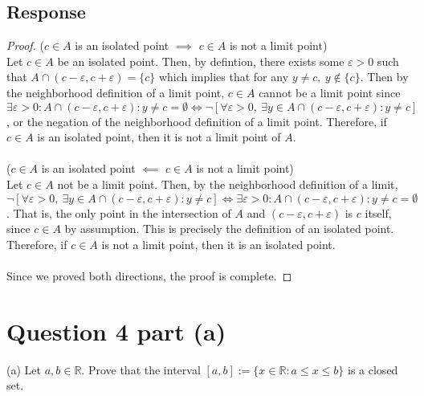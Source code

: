 \documentclass[13pt]{article}
\begin{document}
\subsection*{Response}
\begin{proof}
  ($c \in A$ is an isolated point $\implies$ $c \in A$ is not a limit
  point) \\
  Let $c \in A$ be an isolated point. Then, by defintion, there exists
  some $\varepsilon > 0$ such that $A \cap (c - \varepsilon, c +
  \varepsilon) = \{c\}$ which implies that for any $y \neq c, \ y
  \not\in \{c\}$. Then by the neighborhood definition of a limit
  point, $c \in A$ cannot be a limit point since $\exists \varepsilon
  > 0 : A \cap (c - \varepsilon, c + \varepsilon) : y
  \neq c = \emptyset \iff \neg[\forall \varepsilon > 0, \ \exists y
  \in A \cap (c - \varepsilon, c + \varepsilon) : y \neq c]$, or the
  negation of the neighborhood definition of a limit point. Therefore,
  if $c \in A$ is an isolated point, then it is not a limit point of
  $A$. \\ \\
  ($c \in A$ is an isolated point $\impliedby$ $c \in A$ is not a limit
  point) \\
  Let $c \in A$ not be a limit point. Then, by the neighborhood
  definition of a limit, $\neg[\forall \varepsilon > 0, \ \exists y
  \in A \cap (c - \varepsilon, c + \varepsilon) : y \neq c] \iff \exists \varepsilon
  > 0 : A \cap (c - \varepsilon, c + \varepsilon) : y \neq c =
  \emptyset$. That is, the only point in the intersection of $A$ and
  $(c - \varepsilon, c + \varepsilon)$ is $c$ itself, since $c \in A$
  by assumption. This is precisely the definition of an isolated
  point. Therefore, if $c \in A$ is not a limit point, then it is
  an isolated point. \\ \\
  Since we proved both directions, the proof is complete.
\end{proof}

\newpage
\section*{Question 4 part (a)}
(a) Let $a, b \in \mathbb{R}$. Prove that the interval $[a, b] := \{ x
\in \mathbb{R} : a \leq x \leq b \}$ is a closed set.
\end{document}
